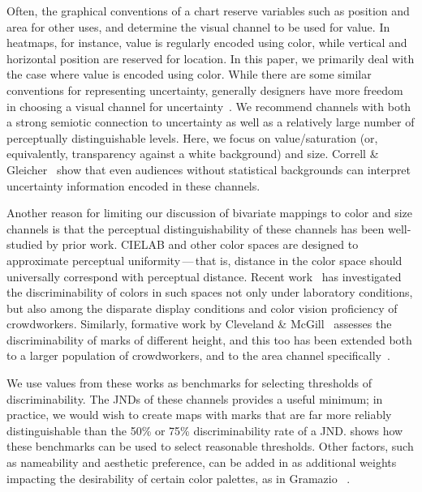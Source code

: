 Often, the graphical conventions of a chart reserve variables such as position and area for other uses, and determine the visual channel to be used for value. In heatmaps, for instance, value is regularly encoded using color, while vertical and horizontal position are reserved for location. In this paper, we primarily deal with the case where value is encoded using color. While there are some similar conventions for representing uncertainty, generally designers have more freedom in choosing a visual channel for uncertainty~\cite{maceachren1992visualizing}. We recommend channels with both a strong semiotic connection to uncertainty as well as a relatively large number of perceptually distinguishable levels. Here, we focus on value/saturation (or, equivalently, transparency against a white background) and size. Correll \& Gleicher~\cite{correll2013error} show that even audiences without statistical backgrounds can interpret uncertainty information encoded in these channels.

Another reason for limiting our discussion of bivariate mappings to color and size channels is that the perceptual distinguishability of these channels has been well-studied by prior work. CIELAB and other color spaces are designed to approximate perceptual uniformity\,---\,that is, distance in the color space should universally correspond with perceptual distance. Recent work~\cite{stone2014engineering,szafir2014adapting} has investigated the discriminability of colors in such spaces not only under laboratory conditions, but also among the disparate display conditions and color vision proficiency of crowdworkers. Similarly, formative work by Cleveland \& McGill~\cite{cleveland1984graphical} assesses the discriminability of marks of different height, and this too has been extended both to a larger population of crowdworkers, and to the area channel specifically~\cite{heer2010crowdsourcing,talbot2014four}.

We use values from these works as benchmarks for selecting thresholds of discriminability. The JNDs of these channels provides a useful minimum; in practice, we would wish to create maps with marks that are far more reliably distinguishable than the 50\% or 75\% discriminability rate of a JND.  shows how these benchmarks can be used to select reasonable thresholds. Other factors, such as nameability and aesthetic preference, can be added in as additional weights impacting the desirability of certain color palettes, as in Gramazio \ea~\cite{gramazio2017colorgorical}.

